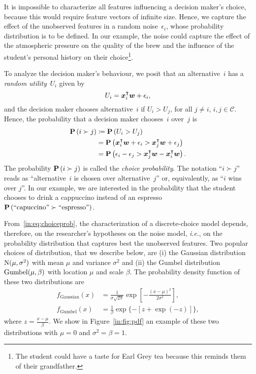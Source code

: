 It is impossible to characterize all features influencing a decision maker's choice, because this would require feature vectors of infinite size.
Hence, we capture the effect of the unobserved features in a random noise~$\epsilon_i$, whose probability distribution is to be defined.
In our example, the noise could capture the effect of the atmospheric pressure on the quality of the brew and the influence of the student's personal history on their choice\footnote{The student could have a taste for Earl Grey tea because this reminds them of their grandfather.}.

To analyze the decision maker's behaviour, we posit that an alternative~$i$ has a \emph{random utility}~$U_i$ given by
\begin{equation*}
	U_i = \bm{x}_i^\intercal \bm{w} + \epsilon_i,
\end{equation*}
and the decision maker chooses alternative~$i$ if $U_i > U_j$, for all $j \neq i$, $i,j \in \mathcal{C}$.
Hence, the probability that a decision maker chooses~$i$ over~$j$ is
\begin{align}
	\label{in:eq:choiceprob}
	\mathbf{P}\left( i \succ j \right) & \coloneqq \mathbf{P}\left( U_i > U_j \right)                                                  \nonumber \\
	                 & = \mathbf{P}\left( \bm{x}_i^\intercal \bm{w} + \epsilon_i > \bm{x}_j^\intercal \bm{w} + \epsilon_j \right) \nonumber  \\
	                 & = \mathbf{P}\left( \epsilon_i - \epsilon_j > \bm{x}_j^\intercal \bm{w} - \bm{x}_i^\intercal \bm{w} \right).
\end{align}
The probability $\mathbf{P}\left( i \succ j \right)$ is called the \emph{choice probability}.
The notation ``$i \succ j$'' reads as ``alternative~$i$ is chosen over alternative~$j$'' or, equivalently, as ``$i$ wins over $j$''.
In our example, we are interested in the probability that the student chooses to drink a cappuccino instead of an espresso $\mathbf{P}\left( \text{``capuccino''} \succ \text{``espresso''} \right)$.

From~\eqref{in:eq:choiceprob}, the characterization of a discrete-choice model depends, therefore, on the researcher's hypotheses on the noise model, \textit{i.e.}, on the probability distribution that captures best the unobserved features.
Two popular choices of distribution, that we describe below, are (i) the Gaussian distribution $\mathrm{N}( \mu, \sigma^2 )$ with mean $\mu$ and variance $\sigma^2$ and (ii) the Gumbel distribution $\mathrm{Gumbel}( \mu, \beta )$ with location $\mu$ and scale $\beta$.
The probability density function of these two distributions are
\begin{align*}
	f_{\text{Gaussian}}(x) & = \frac{1}{\sigma \sqrt{2 \pi}} \exp \left[ -\frac{(x - \mu)^2}{2 \sigma^2} \right], \\
	f_{\text{Gumbel}}(x)   & = \frac{1}{\beta} \exp \{ - [z + \exp(-z)]\},
\end{align*}
where  $z = \frac{x - \mu}{\beta}$.
We show in Figure~\ref{in:fig:pdf} an example of these two distributions with $\mu = 0$ and $\sigma^2 = \beta = 1$.

